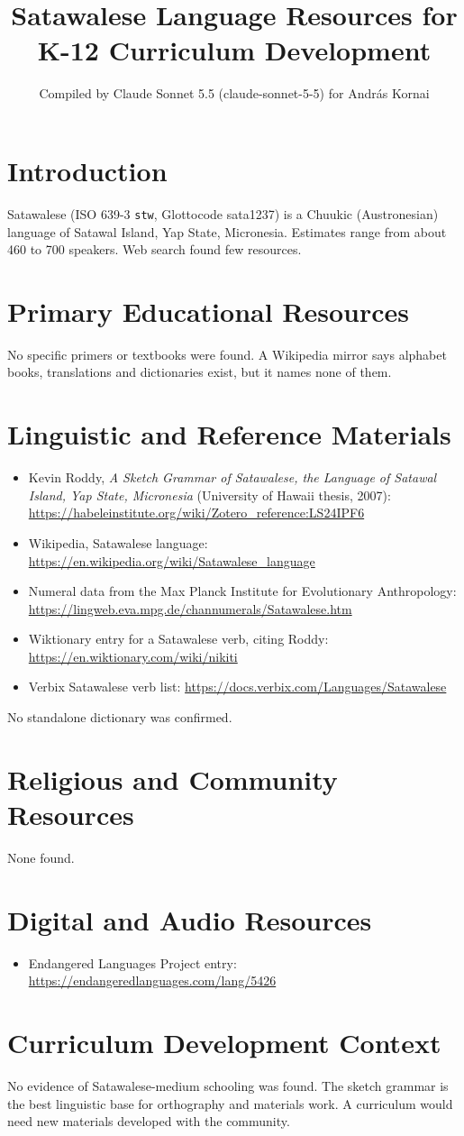 \documentclass[12pt]{article}
\title{Satawalese Language Resources for K-12 Curriculum Development}
\author{Compiled by Claude Sonnet 5.5 (claude-sonnet-5-5) for Andr\'as Kornai}
\date{}
\begin{document}
\maketitle

\section{Introduction}
Satawalese (ISO 639-3 \texttt{stw}, Glottocode sata1237) is a Chuukic (Austronesian) language of Satawal Island, Yap State, Micronesia. Estimates range from about 460 to 700 speakers. Web search found few resources.

\section{Primary Educational Resources}
No specific primers or textbooks were found. A Wikipedia mirror says alphabet books, translations and dictionaries exist, but it names none of them.

\section{Linguistic and Reference Materials}
\begin{itemize}
\item Kevin Roddy, \emph{A Sketch Grammar of Satawalese, the Language of Satawal Island, Yap State, Micronesia} (University of Hawaii thesis, 2007): \url{https://habeleinstitute.org/wiki/Zotero_reference:LS24IPF6}
\item Wikipedia, Satawalese language: \url{https://en.wikipedia.org/wiki/Satawalese_language}
\item Numeral data from the Max Planck Institute for Evolutionary Anthropology: \url{https://lingweb.eva.mpg.de/channumerals/Satawalese.htm}
\item Wiktionary entry for a Satawalese verb, citing Roddy: \url{https://en.wiktionary.com/wiki/nikiti}
\item Verbix Satawalese verb list: \url{https://docs.verbix.com/Languages/Satawalese}
\end{itemize}
No standalone dictionary was confirmed.

\section{Religious and Community Resources}
None found.

\section{Digital and Audio Resources}
\begin{itemize}
\item Endangered Languages Project entry: \url{https://endangeredlanguages.com/lang/5426}
\end{itemize}

\section{Curriculum Development Context}
No evidence of Satawalese-medium schooling was found. The sketch grammar is the best linguistic base for orthography and materials work. A curriculum would need new materials developed with the community.
\end{document}
